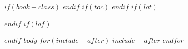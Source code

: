 \documentclass[$if(fontsize)$$fontsize$,$endif$$if(lang)$$lang$,$endif$$if(papersize)$$papersize$,$endif$$for(classoption)$$classoption$$sep$,$endfor$]{$documentclass$}
\begin{document}
\setlength{\tabcolsep}{6pt}




\clearpage
$if(book-class)$
\frontmatter
$endif$
$if(toc)$
\pagestyle{plain}
\setcounter{page}{1}
\setcounter{tocdepth}{2}
\tableofcontents
\clearpage
$endif$
$if(lot)$
\listoftables
$endif$
$if(lof)$
\listoffigures
$endif$
$body$
$for(include-after)$
$include-after$
$endfor$
\end{document}
